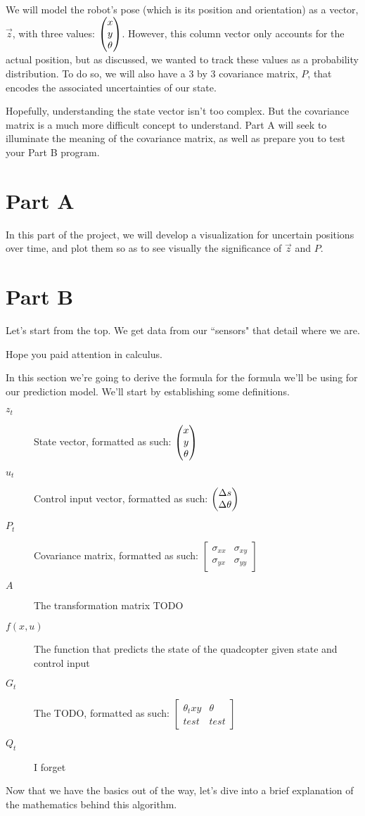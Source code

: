 \documentclass[12pt]{article}
\newcommand*\colvec[3][]{
	\begin{pmatrix}\ifx\relax#1\relax\else#1\\\fi#2\\#3\end{pmatrix}
}
\begin{document}
We will model the robot's pose (which is its position and orientation) as a vector, $\vec{z}$, with three values: $\colvec[x]{y}{\theta}$. However, this column vector only accounts for the actual position, but as discussed, we wanted to track these values as a probability distribution. To do so, we will also have a 3 by 3 covariance matrix, $P$, that encodes the associated uncertainties of our state.

Hopefully, understanding the state vector isn't too complex. But the covariance matrix is a much more difficult concept to understand. Part A will seek to illuminate the meaning of the covariance matrix, as well as prepare you to test your Part B program.

\section{Part A}

In this part of the project, we will develop a visualization for uncertain positions over time, and plot them so as to see visually the significance of $\vec{z}$ and $P$.

\section{Part B}

Let's start from the top. We get data from our ``sensors" that detail where we are.

Hope you paid attention in calculus. 

In this section we're going to derive the formula for the formula we'll be using for our prediction model. We'll start by establishing some definitions.

\begin{description}
	\item[$z_t$] {State vector, formatted as such: $\colvec[x]{y}{\theta}$}
	\item[$u_t$] {Control input vector, formatted as such: $\colvec{\Delta s}{\Delta \theta}$}
	\item[$P_t$] {Covariance matrix, formatted as such: $\begin{bmatrix}\sigma_{xx} & \sigma_{xy}\\\sigma_{yx} & \sigma_{yy}\end{bmatrix}$}
	\item[$A$]   {The transformation matrix TODO}
	\item[$f(x, u)$] {The function that predicts the state of the quadcopter given state and control input}
	\item[$G_t$] {The TODO, formatted as such: $\begin{bmatrix}\theta_t{xy} & \theta\\test & test\end{bmatrix}$}
	\item[$Q_t$] {I forget}
\end{description}

Now that we have the basics out of the way, let's dive into a brief explanation of the mathematics behind this algorithm.
\end{document}
